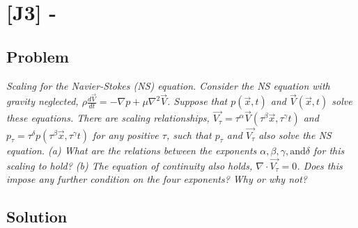 \section{[J3] - }
\label{prob95}


\subsection{Problem}
\textit{Scaling for the Navier-Stokes (NS) equation.  Consider the NS equation with gravity neglected, $\rho \frac{d\vec{V}}{dt} = - \nabla p + \mu \nabla^2 \vec{V}$. Suppose that $p(\vec{x}, t)$ and $\vec{V}(\vec{x}, t)$ solve these equations. There are scaling relationships, $\vec{V_{\tau}} = \tau^{\alpha} \vec{V} (\tau^{\beta} \vec{x}, \tau^{\gamma} t)$ and $p_{\tau} = \tau^{\delta} p (\tau^{\beta} \vec{x}, \tau^{\gamma} t)$ for any positive $\tau$, such that $p_{\tau}$ and $\vec{V_{\tau}}$ also solve the NS equation. (a) What are the relations between the exponents $\alpha, \beta, \gamma, \text{and} \delta$ for this scaling to hold? (b) The equation of continuity also holds, $\nabla \cdot \vec{V_{\tau}} = 0$. Does this impose any further condition on the four exponents? Why or why not?}

\subsection{Solution}






